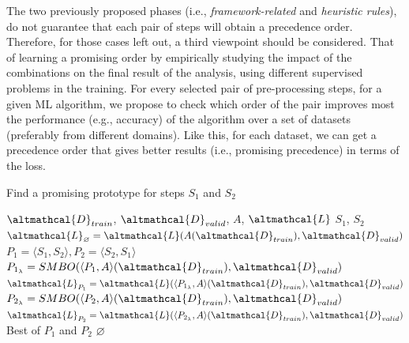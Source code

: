 The two previously proposed phases (i.e., \textit{framework-related} and \textit{heuristic rules}), do not guarantee that each pair of steps will obtain a precedence order.
Therefore, for those cases left out, a third viewpoint should be considered.
That of learning a promising order by empirically studying the impact of the combinations on the final result of the analysis, using different supervised problems in the training.
For every selected pair of pre-processing steps, for a given ML algorithm, we propose to check which order of the pair improves most the performance (e.g., accuracy) of the algorithm over a set of datasets (preferably from different domains).
Like this, for each dataset, we can get a precedence order that gives better results (i.e., promising precedence) in terms of the loss.


\begin{algorithm*}[!h]
	\caption{Find a promising prototype for steps $S_1$ and $S_2$}
	\label{effective-alg:learned-rules}
	\begin{algorithmic}[1]
		\Require $\altmathcal{D}_{train}$, $\altmathcal{D}_{valid}$, $A$, $\altmathcal{L}$ $S_1$, $S_2$ 
		\State $\altmathcal{L}_{\varnothing} = \altmathcal{L}(A(\altmathcal{D}_{train}), \altmathcal{D}_{valid})$ 
		\State $P_1 = \langle S_1, S_2 \rangle, P_2 = \langle S_2, S_1 \rangle$ 
		\State $P_{1_{\lambda}} = SMBO(\langle P_1, A \rangle(\altmathcal{D}_{train}), \altmathcal{D}_{valid})$ 
		\State $\altmathcal{L}_{P_1} = \altmathcal{L}(\langle P_{1_{\lambda}}, A \rangle(\altmathcal{D}_{train}), \altmathcal{D}_{valid})$ 
		\State $P_{2_{\lambda}} = SMBO(\langle P_2, A \rangle(\altmathcal{D}_{train}), \altmathcal{D}_{valid})$
		\State $\altmathcal{L}_{P_2} = \altmathcal{L}(\langle P_{2_{\lambda}}, A \rangle(\altmathcal{D}_{train}), \altmathcal{D}_{valid})$ 
        \State \Return Best of $P_1$ and $P_2$
		\Else
		\State \Return $\varnothing$
		\EndIf
	\end{algorithmic}
\end{algorithm*}

